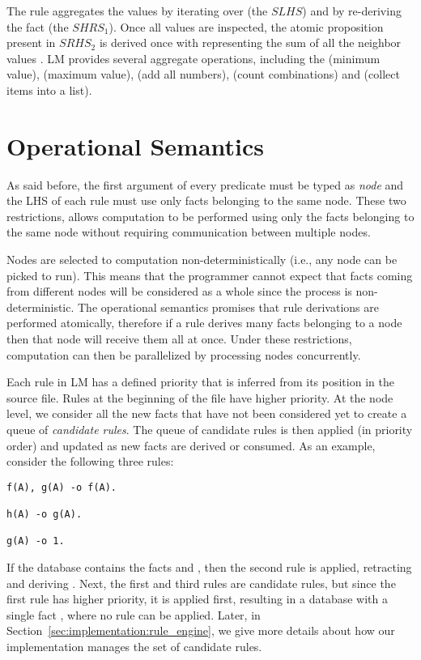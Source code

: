 The rule aggregates the values  by iterating over
 (the $SLHS$) and by re-deriving the
fact  (the $SHRS_1$). Once all
values are inspected, the atomic proposition  present in
$SRHS_2$ is derived once with  representing the sum of all the
neighbor values . LM provides several aggregate operations, including the
 (minimum value),  (maximum value),  (add all
numbers),  (count combinations) and  (collect items
into a list).

\section{Operational Semantics}

As said before, the first argument of every predicate must be typed as
\emph{node} and the LHS of each rule must use only facts belonging to the same
node. These two restrictions, allows computation to be performed using only the
facts belonging to the same node without requiring communication between
multiple nodes.

Nodes are selected to computation non-deterministically (i.e., any node can be
picked to run). This means that the programmer cannot expect that facts coming
from different nodes will be considered as a whole since the process is
non-deterministic. The operational semantics promises that rule derivations are
performed atomically, therefore if a rule derives many facts belonging to a node
then that node will receive them all at once. Under these restrictions,
computation can then be parallelized by processing nodes concurrently.

Each rule in LM has a defined priority that is inferred from its position in the
source file. Rules at the beginning of the file have higher priority. At the
node level, we consider all the new facts that have not been considered yet to
create a queue of \emph{candidate rules}. The queue of candidate rules
is then applied (in priority order) and updated as new facts are derived or
consumed. As an example, consider the following three rules:

\begin{Verbatim}[fontsize=\codesize]
f(A), g(A) -o f(A).

h(A) -o g(A).

g(A) -o 1.
\end{Verbatim}

If the database contains the facts  and , then the
second rule is applied, retracting  and deriving . Next,
the first and third rules are candidate rules, but since the first rule has
higher priority, it is applied first, resulting in a database with a single fact
, where no rule can be applied. Later, in
Section~\ref{sec:implementation:rule_engine}, we give more details about how our
implementation manages the set of candidate rules.

